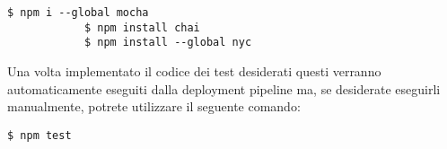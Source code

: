 \begin{center}
	\begin{minipage}{0.5\textwidth}
		\begin{lstlisting}[caption=Comandi per l'esecuzione dei test,numbers=none]
			$ npm i --global mocha
			$ npm install chai
			$ npm install --global nyc
		\end{lstlisting}
	\end{minipage}
\end{center}
\noindent
Una volta implementato il codice dei test desiderati questi verranno automaticamente eseguiti dalla deployment pipeline ma, se desiderate eseguirli manualmente, potrete utilizzare il seguente comando:
\begin{center}
	\begin{minipage}{0.5\textwidth}
		\begin{lstlisting}[caption=Comandi per l'esecuzione dei test,numbers=none]
			$ npm test
		\end{lstlisting}
	\end{minipage}
\end{center}

\newpage


